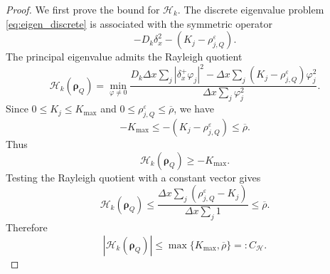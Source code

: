 \documentclass[11pt, dina4, amsfont12]{article}
\begin{document}
\begin{proof}
We first prove the bound for \(\mathcal H_k\). The discrete eigenvalue
problem \eqref{eq:eigen_discrete} is associated with the symmetric operator
\[
    -D_k\delta_x^2-(K_j-\rho_{j,Q}^\varepsilon).
\]
The principal eigenvalue admits the Rayleigh quotient
\[
    \mathcal H_k(\boldsymbol\rho_Q)
    =
    \min_{\varphi\ne0}
    \frac{
        D_k\Delta x\sum_j |\delta_x^+\varphi_j|^2
        -
        \Delta x\sum_j
        (K_j-\rho_{j,Q}^\varepsilon)\varphi_j^2
    }{
        \Delta x\sum_j\varphi_j^2
    } .
\]
Since \(0\le K_j\le K_{\max}\) and
\(0\le \rho_{j,Q}^\varepsilon\le\overline\rho\), we have
\[
    -K_{\max}
    \le
    -(K_j-\rho_{j,Q}^\varepsilon)
    \le
    \overline\rho .
\]
Thus
\[
    \mathcal H_k(\boldsymbol\rho_Q)\ge -K_{\max}.
\]
Testing the Rayleigh quotient with a constant vector gives
\[
    \mathcal H_k(\boldsymbol\rho_Q)
    \le
    \frac{
        \Delta x\sum_j
        (\rho_{j,Q}^\varepsilon-K_j)
    }{
        \Delta x\sum_j1
    }
    \le \overline\rho .
\]
Therefore
\[
    |\mathcal H_k(\boldsymbol\rho_Q)|
    \le
    \max\{K_{\max},\overline\rho\}
    =:C_{\mathcal H}.
\]


\end{proof}
\end{document}
